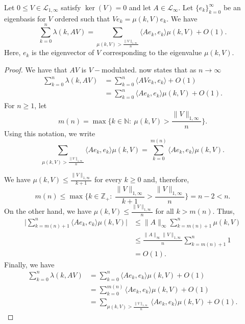     \begin{lem}\label{simple klps lemma} 
        Let $0\leq V\in\mathcal{L}_{1,\infty}$ satisfy $\ker(V) = 0$ and let $A\in\mathcal{L}_{\infty}.$ Let $\{e_k\}_{k=0}^\infty$ be an eigenbasis for $V$ ordered
        such that $Ve_k = \mu(k,V)e_k$. We have        
        \begin{equation*}
            \sum_{k=0}^n\lambda(k,AV) = \sum_{\mu(k,V)>\frac{\|V\|_{1,\infty}}{n}}\langle Ae_k,e_k\rangle\mu(k,V)+O(1).
        \end{equation*}
        Here, $e_k$ is the eigenvector of $V$ corresponding to the eigenvalue $\mu(k,V).$
    \end{lem}
    \begin{proof} 
        We have that $AV$ is $V-$modulated. \cite[Theorem 11.2.3]{LSZ} now states that as $n\to\infty$
        \begin{align*}
            \sum_{k=0}^n\lambda(k,AV) &= \sum_{k=0}^n\langle AVe_k,e_k\rangle+O(1)\\
                                      &=\sum_{k=0}^n\langle Ae_k,e_k\rangle\mu(k,V)+O(1).
        \end{align*}
        For $n\geq 1$, let
        $$m(n)=\max\{k\in\mathbb{N}:\ \mu(k,V)>\frac{\|V\|_{1,\infty}}{n}\}.$$
        Using this notation, we write
        $$\sum_{\mu(k,V)>\frac{\|V\|_{1,\infty}}{n}}\langle Ae_k,e_k\rangle\mu(k,V)=\sum_{k=0}^{m(n)}\langle Ae_k,e_k\rangle\mu(k,V).$$

        We have $\mu(k,V)\leq\frac{\|V\|_{1,\infty}}{k+1}$ for every $k\geq0$ and, therefore,
        $$m(n)\leq \max\Big\{k\in\mathbb{Z}_+:\ \frac{\|V\|_{1,\infty}}{k+1}>\frac{\|V\|_{1,\infty}}{n}\Big\}=n-2<n.$$
        On the other hand, we have $\mu(k,V)\leq\frac{\|V\|_{1,\infty}}n$ for all $k>m(n)$. Thus,
        \begin{align*}
            \Big|\sum_{k=m(n)+1}^n\langle Ae_k,e_k\rangle\mu(k,V)\Big| &\leq \|A\|_{\infty} \sum_{k=m(n)+1}^n\mu(k,V)\\
                                                                    &\leq \frac{\|A\|_{\infty}\|V\|_{1,\infty}}{n}\sum_{k=m(n)+1}^n1\\
                                                                    &= O(1).
        \end{align*}
        Finally, we have
        \begin{align*}
            \sum_{k=0}^n\lambda(k,AV) &= \sum_{k=0}^n\langle Ae_k,e_k\rangle\mu(k,V)+O(1)\\
                                      &= \sum_{k=0}^{m(n)}\langle Ae_k,e_k\rangle\mu(k,V)+O(1)\\
                                      &= \sum_{\mu(k,V)>\frac{\|V\|_{1,\infty}}{n}}\langle Ae_k,e_k\rangle\mu(k,V)+O(1).
        \end{align*}
    \end{proof}
    
